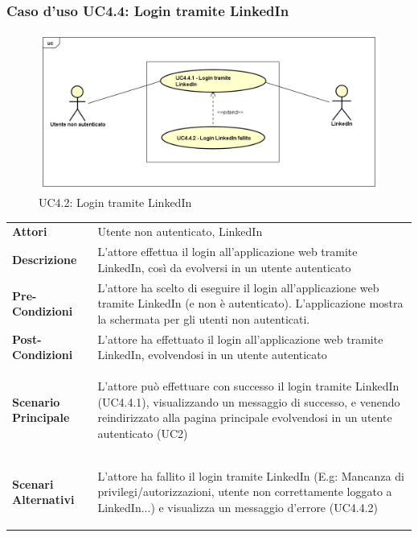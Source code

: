 \newpage
\subsubsection{Caso d'uso UC4.4: Login tramite LinkedIn }
\label{UC4_4}
\begin{figure}[!htbp]
	\centering
	\includegraphics[scale=0.45]{UML/UC4_4.png}
	\caption{UC4.2: Login tramite LinkedIn}
\end{figure}

\begin{tabular}{ l | p{11cm}}
	\hline
	\rowcolor{Gray}
	\multicolumn{2}{c}{UC4.4 - Login tramite LinkedIn} \\
	\hline
	\textbf{Attori} & Utente non autenticato, LinkedIn \\
	\textbf{Descrizione} & L'attore effettua il login all'applicazione web tramite LinkedIn, così da evolversi in un utente autenticato \\
	\textbf{Pre-Condizioni} & L'attore ha scelto di eseguire il login all'applicazione web tramite LinkedIn (e non è autenticato). L'applicazione mostra la schermata per gli utenti non autenticati. \\
	\textbf{Post-Condizioni} & L'attore ha effettuato il login all'applicazione web tramite LinkedIn, evolvendosi in un utente autenticato \\
	\textbf{Scenario Principale} & 
	\begin{enumerate*}[label=(\arabic*.),itemjoin={\newline}]
		\item L'attore può effettuare con successo il login tramite LinkedIn (UC4.4.1), visualizzando un messaggio di successo, e venendo reindirizzato alla pagina principale evolvendosi in un utente autenticato (UC2)
	\end{enumerate*}\\
	\textbf{Scenari Alternativi} & 
	\begin{enumerate*}[label=(\arabic*.),itemjoin={\newline}]
	\item L'attore ha fallito il login tramite LinkedIn (E.g: Mancanza di privilegi/autorizzazioni, utente non correttamente loggato a LinkedIn...) e visualizza un messaggio d'errore (UC4.4.2)
	\end{enumerate*}\\
\end{tabular}